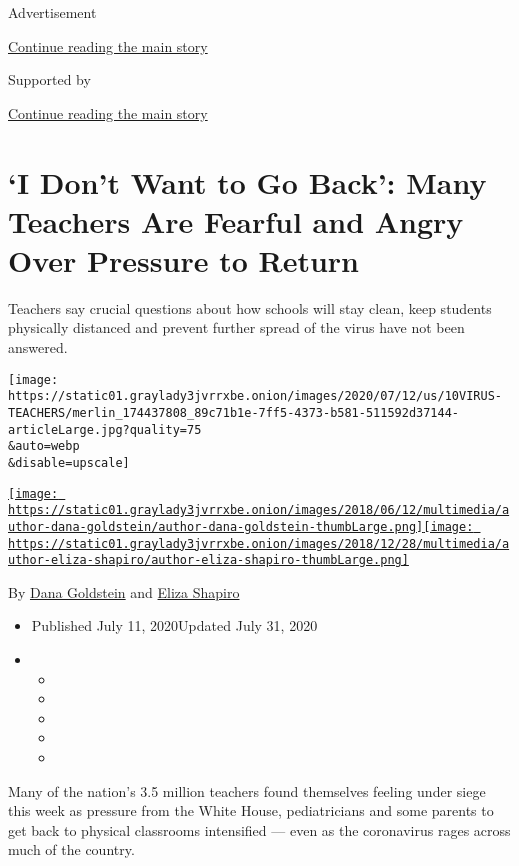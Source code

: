 Advertisement

\protect\hyperlink{after-top}{Continue reading the main story}

Supported by

\protect\hyperlink{after-sponsor}{Continue reading the main story}

\hypertarget{i-dont-want-to-go-back-many-teachers-are-fearful-and-angry-over-pressure-to-return}{%
\section{`I Don't Want to Go Back': Many Teachers Are Fearful and Angry
Over Pressure to
Return}\label{i-dont-want-to-go-back-many-teachers-are-fearful-and-angry-over-pressure-to-return}}

Teachers say crucial questions about how schools will stay clean, keep
students physically distanced and prevent further spread of the virus
have not been answered.

\texttt{[image: https://static01.graylady3jvrrxbe.onion/images/2020/07/12/us/10VIRUS-TEACHERS/merlin\_174437808\_89c71b1e-7ff5-4373-b581-511592d37144-articleLarge.jpg?quality=75\\\&auto=webp\\\&disable=upscale]}

\href{https://www.nytimes3xbfgragh.onion/by/dana-goldstein}{\texttt{[image: https://static01.graylady3jvrrxbe.onion/images/2018/06/12/multimedia/author-dana-goldstein/author-dana-goldstein-thumbLarge.png]}}\href{https://www.nytimes3xbfgragh.onion/by/eliza-shapiro}{\texttt{[image: https://static01.graylady3jvrrxbe.onion/images/2018/12/28/multimedia/author-eliza-shapiro/author-eliza-shapiro-thumbLarge.png]}}

By \href{https://www.nytimes3xbfgragh.onion/by/dana-goldstein}{Dana
Goldstein} and
\href{https://www.nytimes3xbfgragh.onion/by/eliza-shapiro}{Eliza
Shapiro}

\begin{itemize}
\item
  Published July 11, 2020Updated July 31, 2020
\item
  \begin{itemize}
  \item
  \item
  \item
  \item
  \item
  \end{itemize}
\end{itemize}

Many of the nation's 3.5 million teachers found themselves feeling under
siege this week as pressure from the White House, pediatricians and some
parents to get back to physical classrooms intensified --- even as the
coronavirus rages across much of the country.

